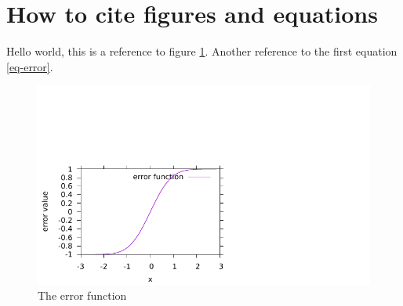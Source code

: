 \documentclass[twocolumn]{article}
\begin{document}
\section{How to cite figures and equations}
Hello world, this is a reference to figure \ref{fig-error}. Another reference to the first equation \ref{eq-error}.

\begin{figure}[h]
\includegraphics{plot.pdf}
\caption{The error function}
\label{fig-error}
\end{figure}
\end{document}
